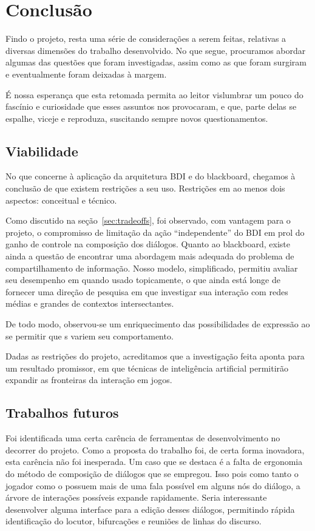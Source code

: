 \chapter{Conclusão}

Findo o projeto, resta uma série de considerações a serem feitas,
relativas a diversas dimensões do trabalho desenvolvido. No que
segue, procuramos abordar algumas das questões que foram investigadas,
assim como as que foram surgiram e eventualmente foram deixadas à
margem.

É nossa esperança que esta retomada permita ao leitor vislumbrar um
pouco do fascínio e curiosidade que esses assuntos nos provocaram, e
que, parte delas se espalhe, viceje e reproduza, suscitando sempre
novos questionamentos.

\section{Viabilidade}

No que concerne à aplicação da arquitetura BDI e do blackboard,
chegamos à conclusão de que existem restrições a seu uso. Restrições
em ao menos dois aspectos: conceitual e técnico.

Como discutido na seção~\ref{sec:tradeoffs}, foi observado, com
vantagem para o projeto, o compromisso de limitação da ação
``independente'' do BDI em prol do ganho de controle na composição dos
diálogos. Quanto ao blackboard, existe ainda a questão de encontrar
uma abordagem mais adequada do problema de compartilhamento de
informação. Nosso modelo, simplificado, permitiu avaliar seu
desempenho em quando usado topicamente, o que ainda está longe de
fornecer uma direção de pesquisa em que investigar sua interação com
redes médias e grandes de contextos intersectantes.

De todo modo, observou-se um enriquecimento das possibilidades de
expressão ao se permitir que \npc{}s variem seu comportamento.

Dadas as restrições do projeto, acreditamos que a investigação feita aponta para um resultado promissor, em que técnicas de inteligência artificial permitirão expandir as fronteiras da interação em jogos.

\section{Trabalhos futuros}

Foi identificada uma certa carência de ferramentas de desenvolvimento no decorrer do projeto.
Como a proposta do trabalho foi, de certa forma inovadora, esta carência não foi inesperada. Um caso que se destaca é a falta de ergonomia do método de composição de diálogos que se empregou. Isso pois como tanto o jogador como o \npc{} possuem mais de uma fala possível em alguns nós do diálogo, a árvore de interações possíveis expande rapidamente. Seria interessante desenvolver alguma interface para a  edição desses diálogos, permitindo rápida identificação do locutor, bifurcações e reuniões de linhas do discurso.

